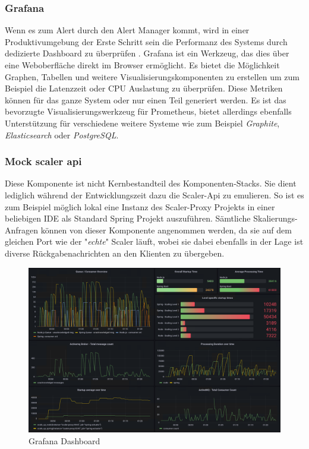 \subsubsection{Grafana \checkmark}
Wenn es zum Alert durch den Alert Manager kommt, wird in einer Produktivumgebung der Erste Schritt sein die Performanz des Systems durch dedizierte Dashboard zu überprüfen \cite[Seite~97]{oreillyPrometheus}. Grafana ist ein Werkzeug, das dies über eine Weboberfläche direkt im Browser ermöglicht. Es bietet die Möglichkeit Graphen, Tabellen und weitere Visualisierungskomponenten zu erstellen um zum Beispiel die Latenzzeit oder CPU Auslastung zu überprüfen. Diese Metriken können für das ganze System oder nur einen Teil generiert werden. Es ist das bevorzugte Visualisierungswerkzeug für Prometheus, bietet allerdings ebenfalls Unterstützung für verschiedene weitere Systeme wie zum Beispiel \emph{Graphite}, \emph{Elasticsearch} oder \emph{PostgreSQL}.


\subsubsection{Mock scaler api \checkmark}
Diese Komponente ist nicht Kernbestandteil des Komponenten-Stacks. Sie dient lediglich während der Entwicklungszeit dazu die Scaler-Api zu emulieren. So ist es zum Beispiel möglich lokal eine Instanz des Scaler-Proxy Projekts in einer beliebigen IDE als Standard Spring Projekt auszuführen. Sämtliche Skalierungs-Anfragen können von dieser Komponente angenommen werden, da sie auf dem gleichen Port wie der "\emph{echte}" Scaler läuft, wobei sie dabei ebenfalls in der Lage ist diverse Rückgabenachrichten an den Klienten zu übergeben.


\begin{figure}
	\centering
	\includegraphics[width=\linewidth]{kapitel/problemloesung/implementierung/_img/grafana-dashboard-01}
	\caption[]{Grafana Dashboard}
	\label{fig:grafanaOverview}
\end{figure}


